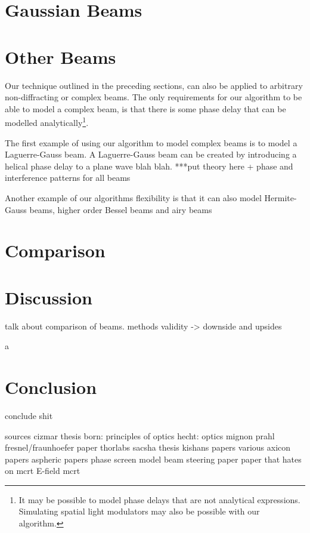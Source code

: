 \section{Gaussian Beams}

% 

\section{Other Beams}

Our technique outlined in the preceding sections, can also be applied to arbitrary non-diffracting or complex beams. The only requirements for our algorithm to be able to model a complex beam, is that there is some phase delay that can be modelled analytically\footnote{It may be possible to model phase delays that are not analytical expressions. Simulating spatial light modulators may also be possible with our algorithm.}.

The first example of using our algorithm to model complex beams is to model a Laguerre-Gauss beam. A Laguerre-Gauss beam can be created by introducing a helical phase delay to a plane wave blah blah. ***put theory here + phase and interference patterns for all beams

Another example of our algorithms flexibility is that it can also model Hermite-Gauss beams, higher order Bessel beams and airy beams

\section{Comparison}

\section{Discussion}

talk about comparison of beams. methods validity -> downside and upsides

a~\cite{mignon2016fractional}
\section{Conclusion}

conclude shit


sources
cizmar thesis
born: principles of optics
hecht: optics
mignon
prahl
fresnel/fraunhoefer paper
thorlabs
sacsha thesis
kishans papers
various axicon papers
aspheric papers
phase screen model
beam steering paper
paper that hates on mcrt
E-field mcrt